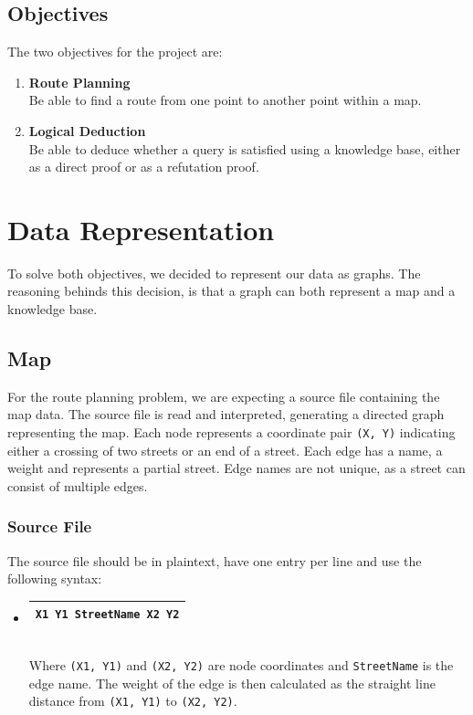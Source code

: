 \documentclass[11pt]{article}
\newcommand{\tbox}[1] {\begin{tabular}{| c |}\hline {#1} \\ \hline\end{tabular}}
\begin{document}
\subsection{Objectives}
The two objectives for the project are:
\begin{enumerate}
	\item[] \textbf{Route Planning}\\
	Be able to find a route from one point to another point within a map.
	
	\item[] \textbf{Logical Deduction}\\
	Be able to deduce whether a query is satisfied using a knowledge base, either as a direct proof or as a refutation proof. 
\end{enumerate}

\section{Data Representation}
To solve both objectives, we decided to represent our data as graphs. The reasoning behinds this decision, is that a graph can both represent a map and a knowledge base.

\subsection{Map}
For the route planning problem, we are expecting a source file containing the map data. The source file is read and interpreted, generating a directed graph representing the map. Each node represents a coordinate pair {\tt (X, Y)} indicating either a crossing of two streets or an end of a street. Each edge has a name, a weight and represents a partial street. Edge names are not unique, as a street can consist of multiple edges.

\subsubsection{Source File}
The source file should be in plaintext, have one entry per line and use the following syntax:
\begin{itemize}
	\item \tbox{\tt X1 Y1 StreetName X2 Y2}\\
	Where {\tt (X1, Y1)} and {\tt (X2, Y2)} are node coordinates and {\tt StreetName} is the edge name. The weight of the edge is then calculated as the straight line distance from {\tt (X1, Y1)} to {\tt (X2, Y2)}.
\end{itemize}
\end{document}

